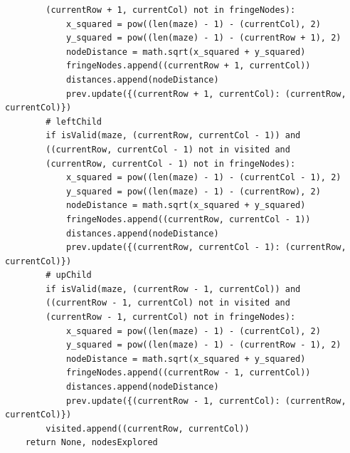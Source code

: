 \documentclass[11pt]{article}
\begin{document}
\begin{verbatim}
        (currentRow + 1, currentCol) not in fringeNodes):
            x_squared = pow((len(maze) - 1) - (currentCol), 2)
            y_squared = pow((len(maze) - 1) - (currentRow + 1), 2)
            nodeDistance = math.sqrt(x_squared + y_squared)
            fringeNodes.append((currentRow + 1, currentCol))
            distances.append(nodeDistance)
            prev.update({(currentRow + 1, currentCol): (currentRow, currentCol)})
        # leftChild
        if isValid(maze, (currentRow, currentCol - 1)) and 
        ((currentRow, currentCol - 1) not in visited and 
        (currentRow, currentCol - 1) not in fringeNodes):
            x_squared = pow((len(maze) - 1) - (currentCol - 1), 2)
            y_squared = pow((len(maze) - 1) - (currentRow), 2)
            nodeDistance = math.sqrt(x_squared + y_squared)
            fringeNodes.append((currentRow, currentCol - 1))
            distances.append(nodeDistance)
            prev.update({(currentRow, currentCol - 1): (currentRow, currentCol)})
        # upChild
        if isValid(maze, (currentRow - 1, currentCol)) and 
        ((currentRow - 1, currentCol) not in visited and 
        (currentRow - 1, currentCol) not in fringeNodes):
            x_squared = pow((len(maze) - 1) - (currentCol), 2)
            y_squared = pow((len(maze) - 1) - (currentRow - 1), 2)
            nodeDistance = math.sqrt(x_squared + y_squared)
            fringeNodes.append((currentRow - 1, currentCol))
            distances.append(nodeDistance)
            prev.update({(currentRow - 1, currentCol): (currentRow, currentCol)})
        visited.append((currentRow, currentCol))
    return None, nodesExplored
\end{verbatim}
\end{document}
